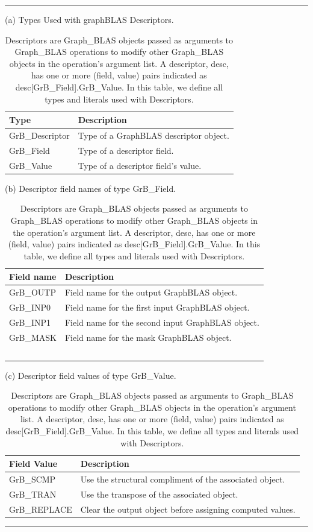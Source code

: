 \begin{table}
\hrule
\begin{center}
\caption{Descriptors are Graph\_BLAS objects passed as arguments to Graph\_BLAS 
operations to modify other Graph\_BLAS objects in the operation's argument list.
A descriptor, {\sf desc}, has one or more (field, value) pairs indicated 
as  {\sf desc[GrB\_Field].GrB\_Value}. In this table, we define all types and literals used
with Descriptors.}
\label{Tab:DescTypeLiterals}

\vspace{1\baselineskip}
(a) Types Used with graphBLAS Descriptors.
\vspace{1\baselineskip}

\begin{tabular}{l|l}
Type			& Description \\ \hline
{\sf GrB\_Descriptor}     &  Type of a GraphBLAS descriptor object. \\
{\sf GrB\_Field}              &  Type of a descriptor field. \\
{\sf GrB\_Value}             &  Type of a descriptor field's value. \\
\end{tabular}

\vspace{1\baselineskip}
(b) Descriptor field names of type {\sf GrB\_Field}.
\vspace{1\baselineskip}

\begin{tabular}{l|l}
Field name          & Description \\ \hline
{\sf GrB\_OUTP} &  Field name for the output GraphBLAS object. \\
{\sf GrB\_INP0}   &  Field name for the first input GraphBLAS object. \\
{\sf GrB\_INP1}   &  Field name for the second input  GraphBLAS object. \\
{\sf GrB\_MASK} &  Field name for the mask GraphBLAS object. \\\
\end{tabular}

\vspace{1\baselineskip}
(c) Descriptor field values of type {\sf GrB\_Value}.
\vspace{1\baselineskip}

\begin{tabular}{l|l}
Field Value                & Description \\ \hline
{\sf GrB\_SCMP}       &  Use the structural compliment of the associated object.\\
{\sf GrB\_TRAN}        &  Use the transpose of the associated object.\\
{\sf GrB\_REPLACE} &  Clear the output object before assigning computed values.\\
\end{tabular}
\end{center}
\hrule
\end{table}



